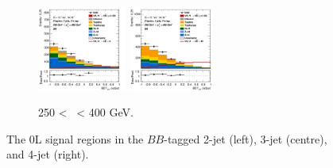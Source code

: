 \begin{figure}[h!]
\begin{subfigure}[b]{\textwidth}
        \includegraphics[width=0.32\textwidth]{Images/VH/Own_fit/prefit_VHbb/Region_distmva_BMax400_BMin250_DSR_J3_TTypebb_T2_L0_Y6051_Prefit.png}
        \includegraphics[width=0.32\textwidth]{Images/VH/Own_fit/prefit_VHbb/Region_distmva_BMax400_BMin250_DSR_J4_TTypebb_T2_L0_Y6051_Prefit.png}
        \caption{250 < \ptv\ < 400 GeV.}
        \label{fig:plots_VHbb_OL_250_SR}
    \end{subfigure}
    \caption{The 0L signal regions in the $BB$-tagged 2-jet (left), 3-jet (centre), and 4-jet (right).}
    \label{fig:plots_VHbb_OL_SR}
\end{figure} 

